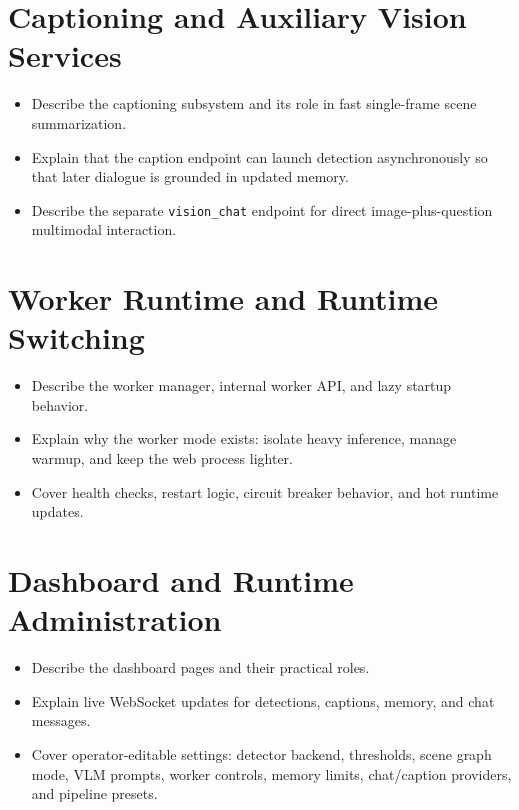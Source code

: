 \section{Captioning and Auxiliary Vision Services}
\begin{itemize}
    \item Describe the captioning subsystem and its role in fast single-frame scene summarization.
    \item Explain that the caption endpoint can launch detection asynchronously so that later dialogue is grounded in updated memory.
    \item Describe the separate \texttt{vision\_chat} endpoint for direct image-plus-question multimodal interaction.
\end{itemize}

\section{Worker Runtime and Runtime Switching}
\begin{itemize}
    \item Describe the worker manager, internal worker API, and lazy startup behavior.
    \item Explain why the worker mode exists: isolate heavy inference, manage warmup, and keep the web process lighter.
    \item Cover health checks, restart logic, circuit breaker behavior, and hot runtime updates.
\end{itemize}

\section{Dashboard and Runtime Administration}
\begin{itemize}
    \item Describe the dashboard pages and their practical roles.
    \item Explain live WebSocket updates for detections, captions, memory, and chat messages.
    \item Cover operator-editable settings: detector backend, thresholds, scene graph mode, VLM prompts, worker controls, memory limits, chat/caption providers, and pipeline presets.
\end{itemize}
